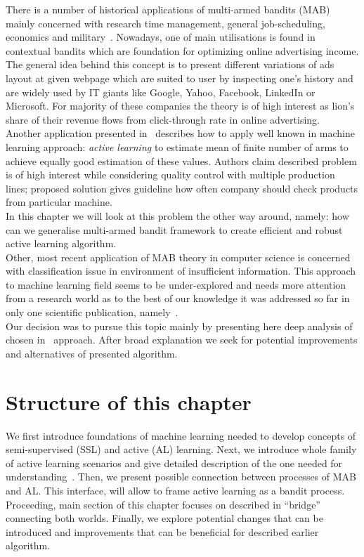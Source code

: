 \documentclass[12pt, a4paper, pdflatex, leqno]{report}
\begin{document}
There is a number of historical applications of multi-armed bandits (MAB) mainly concerned with research time management, general job-scheduling, economics and military~\citep{gittins+glazebrook+weber}.
Nowadays, one of main utilisations is found in contextual bandits which are foundation for optimizing online advertising income. The general idea behind this concept is to present different variations of ads layout at given webpage which are suited to user by inspecting one's history and are widely used by IT giants like Google, Yahoo, Facebook, LinkedIn or Microsoft. For majority of these companies the theory is of high interest as lion's share of their revenue flows from click-through rate in online advertising.~\citep{graepel2010web, Scott:2010:MBL:1944422.1944432}\\

Another application presented in~\citep{Antos09activelearning} describes how to apply well known in machine learning approach: \emph{active learning} to estimate mean of finite number of arms to achieve equally good estimation of these values. Authors claim described problem is of high interest while considering quality control with multiple production lines; proposed solution gives guideline how often company should check products from particular machine.\\
In this chapter we will look at this problem the other way around, namely: how can we generalise multi-armed bandit framework to create efficient and robust active learning algorithm.\\

Other, most recent application of MAB theory in computer science is concerned with classification issue in environment of insufficient information. This approach to machine learning field seems to be under-explored and needs more attention from a research world as to the best of our knowledge it was addressed so far in only one scientific publication, namely~\citep{DBLP:journals/corr/GantiG13}.\\
Our decision was to pursue this topic mainly by presenting here deep analysis of chosen in~\citep{DBLP:journals/corr/GantiG13} approach. After broad explanation we seek for potential improvements and alternatives of presented algorithm.

\section{Structure of this chapter}
We first introduce foundations of machine learning needed to develop concepts of semi-supervised (SSL) and active (AL) learning. Next, we introduce whole family of active learning scenarios and give detailed description of the one needed for understanding~\citep{DBLP:journals/corr/GantiG13}. Then, we present possible connection between processes of MAB and AL. This interface, will allow to frame active learning as a bandit process.\\
Proceeding, main section of this chapter focuses on described in \citep{DBLP:journals/corr/GantiG13} ``bridge'' connecting both worlds. Finally, we explore potential changes that can be introduced and improvements that can be beneficial for described earlier algorithm.
\end{document}
